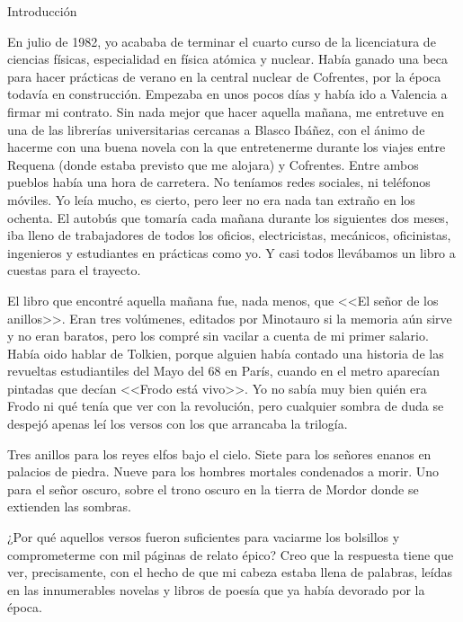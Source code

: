 Introducción

En julio de 1982, yo acababa de terminar el cuarto curso de la licenciatura de ciencias físicas, especialidad en física atómica y nuclear. Había ganado una beca para hacer prácticas de verano en la central nuclear de Cofrentes, por la época todavía en construcción. Empezaba en unos pocos días y había ido a Valencia a firmar mi contrato. Sin nada mejor que hacer aquella mañana, me entretuve en una de las librerías universitarias cercanas a Blasco Ibáñez, con el ánimo de hacerme con una buena novela con la que entretenerme durante los viajes entre Requena (donde estaba previsto que me alojara) y Cofrentes. Entre ambos pueblos había una hora de carretera. No teníamos redes sociales, ni teléfonos móviles. Yo leía mucho, es cierto, pero leer no era nada tan extraño en los ochenta. El autobús que tomaría cada mañana durante los siguientes dos meses, iba lleno de trabajadores de todos los oficios, electricistas, mecánicos, oficinistas, ingenieros y estudiantes en prácticas como yo. Y casi todos llevábamos un libro a cuestas para el trayecto. 

El libro que encontré aquella mañana fue, nada menos, que <<El señor de los anillos>>. Eran tres volúmenes, editados por Minotauro si la memoria aún sirve y no eran baratos, pero los compré sin vacilar a cuenta de mi primer salario. Había oido hablar de Tolkien, porque alguien había contado una historia de las revueltas estudiantiles del Mayo del 68 en París, cuando en el metro aparecían pintadas que decían <<Frodo está vivo>>. Yo no sabía muy bien quién era Frodo ni qué tenía que ver con la revolución, pero cualquier sombra de duda se despejó apenas leí los versos con los que arrancaba la trilogía. 

Tres anillos para los reyes elfos bajo el cielo.
Siete para los señores enanos en palacios de piedra.
Nueve para los hombres mortales condenados a morir.
Uno para el señor oscuro, sobre el trono oscuro
en la tierra de Mordor donde se extienden las sombras.

¿Por qué aquellos versos fueron suficientes para vaciarme los bolsillos y comprometerme con mil páginas de relato épico? Creo que la respuesta tiene que ver, precisamente, con el hecho de que mi cabeza estaba llena de palabras, leídas en las innumerables novelas y libros de poesía que ya había devorado por la época. 


